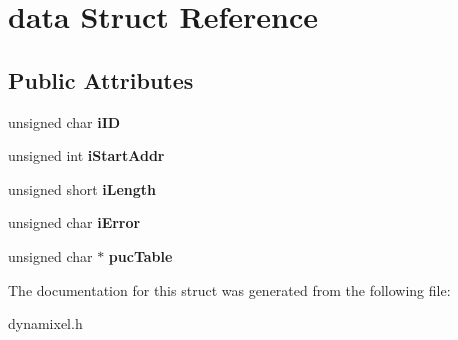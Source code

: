 \hypertarget{structdata}{}\section{data Struct Reference}
\label{structdata}
\subsection*{Public Attributes}
\begin{DoxyCompactItemize}
\item 
\hypertarget{structdata_a5a553f5c59b2c973d161ea3352c32d07}{}unsigned char {\bfseries i\+I\+D}\label{structdata_a5a553f5c59b2c973d161ea3352c32d07}

\item 
\hypertarget{structdata_a849125c9807b08e525118cdca5a255fe}{}unsigned int {\bfseries i\+Start\+Addr}\label{structdata_a849125c9807b08e525118cdca5a255fe}

\item 
\hypertarget{structdata_a836daaa4328239851986211241acbcca}{}unsigned short {\bfseries i\+Length}\label{structdata_a836daaa4328239851986211241acbcca}

\item 
\hypertarget{structdata_a907d6311fb7b92b5960df0bef3b32c43}{}unsigned char {\bfseries i\+Error}\label{structdata_a907d6311fb7b92b5960df0bef3b32c43}

\item 
\hypertarget{structdata_a03c940df871cecb40e4f5ca39f14cc49}{}unsigned char $\ast$ {\bfseries puc\+Table}\label{structdata_a03c940df871cecb40e4f5ca39f14cc49}

\end{DoxyCompactItemize}


The documentation for this struct was generated from the following file\+:\begin{DoxyCompactItemize}
\item 
dynamixel.\+h\end{DoxyCompactItemize}
